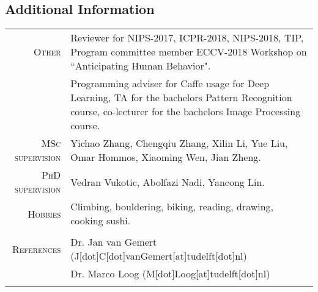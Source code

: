 \documentclass[a4paper, oneside, final]{scrartcl}
\begin{document}
\begin{center}
		\section{Additional Information}
		\begin{tabular}{r@{\hskip 0.3in}p{11.3cm}}
			\textsc{Other}			 & Reviewer for NIPS-2017, ICPR-2018, NIPS-2018, TIP, Program committee member ECCV-2018 Workshop on ``Anticipating Human Behavior".\\
									 & Programming adviser for Caffe usage for Deep Learning, TA for the bachelors Pattern Recognition course, co-lecturer for the bachelors Image Processing course.\\
			\textsc{MSc supervision} & Yichao Zhang, Chengqiu Zhang, Xilin Li, Yue Liu, Omar Hommos, Xiaoming Wen, Jian Zheng.\\
			\textsc{PhD supervision} & Vedran Vukotic, Abolfazi Nadi, Yancong Lin.\\[5px] 
			\textsc{Hobbies}		 & Climbing, bouldering, biking, reading, drawing, cooking sushi.\\					 
			\multicolumn{2}{c}{}\\

			\textsc{References} & Dr. Jan van Gemert (J[dot]C[dot]vanGemert[at]tudelft[dot]nl)\\
                                & Dr. Marco Loog (M[dot]Loog[at]tudelft[dot]nl)\\[5px]
			\multicolumn{2}{c}{}\\
		\end{tabular}
	\end{center}
\end{document}
